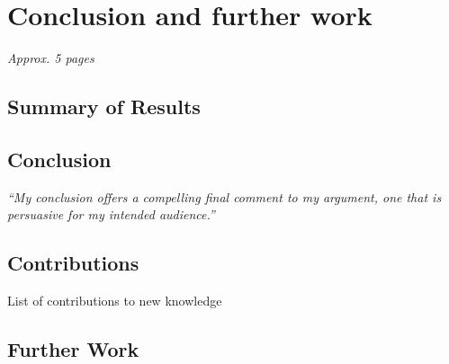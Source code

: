\chapter{Conclusion and further work}
\label{ch:conclusion}
\textit{Approx. 5 pages}

\section{Summary of Results}

\section{Conclusion}
\emph{``My conclusion offers a compelling final comment to my argument, one that is persuasive for my
intended audience.''}

\section{Contributions}
List of contributions to new knowledge

\section{Further Work}